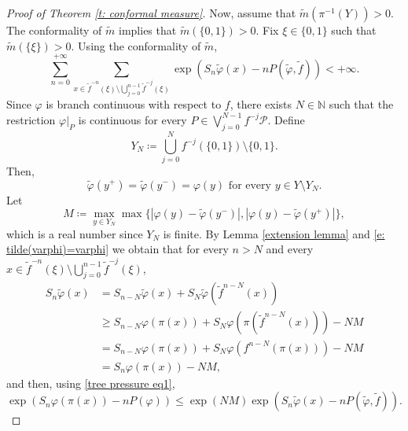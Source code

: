 \documentclass[12pt]{amsart}
\numberwithin{equation}{section} %
\numberwithin{figure}{section} %
\theoremstyle{plain}
\theoremstyle{definition}
\theoremstyle{remark}
\theoremstyle{citing}
\newcommand{\N}{\mathbb{N}}
\renewcommand{\=}{\coloneqq}
\begin{document}
\begin{proof}[Proof of Theorem \ref{t: conformal measure}]
Now, assume that $\widetilde{m}(\pi^{-1}(Y))>0$. The conformality of $\widetilde{m}$ implies that $\widetilde{m}(\{0,1\})>0$. Fix $\xi\in \{0,1\}$ such that $\widetilde{m}({\{\xi\}})>0$. Using the conformality of $\widetilde{m}$,
\begin{equation}\label{e: finite series extension}
     \sum_{n=0}^{+\infty} \sum_{x\in \widetilde{f}^{-n}(\xi)\setminus \bigcup_{j=0}^{n-1}\widetilde{f}^{-j}(\xi)} \exp(S_n\widetilde{\varphi}(x) - nP(\widetilde{\varphi},\widetilde{f})) <+\infty.
\end{equation}
Since $\varphi$ is branch continuous with respect to $f$, there exists $N\in \N$ such that the restriction $\varphi|_{P}$ is continuous for every $P\in \bigvee_{j=0}^{N-1}f^{-j}\mathcal{P}$. Define 
\begin{equation}
    Y_N \= \bigcup_{j=0}^{N}f^{-j}(\{0,1\})\setminus\{0,1\}.
\end{equation}
Then,
\begin{equation}\label{e: tilde(varphi)=varphi}
    \widetilde{\varphi}(y^+) = \widetilde{\varphi}(y^-) = \varphi(y) \text{ for every }y\in Y\setminus Y_N.
\end{equation}
Let
\begin{equation*}
M\= \max_{y\in Y_N}\max\{|\varphi(y) - \widetilde{\varphi}(y^{-})|,|\varphi(y) - \widetilde{\varphi}(y^{+})|\},
\end{equation*}
which is a real number since $Y_N$ is finite.
By Lemma \ref{extension lemma} and \eqref{e: tilde(varphi)=varphi} we obtain that for every $n>N$ and every $x\in \widetilde{f}^{-n}(\xi)\setminus \bigcup_{j=0}^{n-1}\widetilde{f}^{-j}(\xi)$,
\begin{equation*}
    \begin{split}
        S_n\widetilde{\varphi}(x) &= S_{n-N}\widetilde{\varphi}(x) + S_N\widetilde{\varphi}(\widetilde{f}^{n-N}(x))\\
        & \geq S_{n-N}\varphi(\pi(x)) + S_{N}\varphi(\pi(\widetilde{f}^{n-N}(x))) - NM\\
        &= S_{n-N}\varphi(\pi(x)) + S_{N}\varphi(f^{n-N}(\pi(x))) - NM\\
        &= S_n\varphi(\pi(x)) - NM,
    \end{split}
\end{equation*}
and then, using \eqref{tree pressure eq1},
\begin{equation}\label{e: bound S_nvarphi by S_n tilde(varphi)}
    \exp(S_n\varphi(\pi(x)) - nP(\varphi)) \leq \exp(NM)\exp(S_n\widetilde{\varphi}(x)-nP(\widetilde{\varphi},\widetilde{f})).

\end{equation}
\end{proof}
\end{document}
